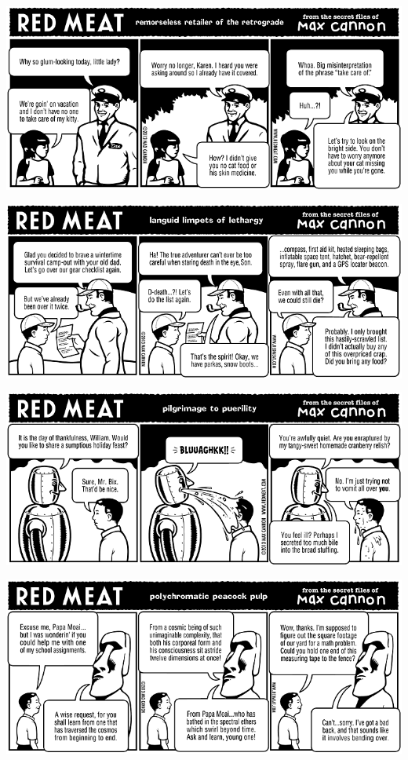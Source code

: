 \documentclass[a4paper,twoside,11pt]{article}
\begin{document}
\includegraphics[width=\textwidth]{redmeat_2013-11-12.png}



\includegraphics[width=\textwidth]{redmeat_2013-11-19.png}



\includegraphics[width=\textwidth]{redmeat_2013-11-26.png}



\includegraphics[width=\textwidth]{redmeat_2013-12-03.png}
\end{document}
